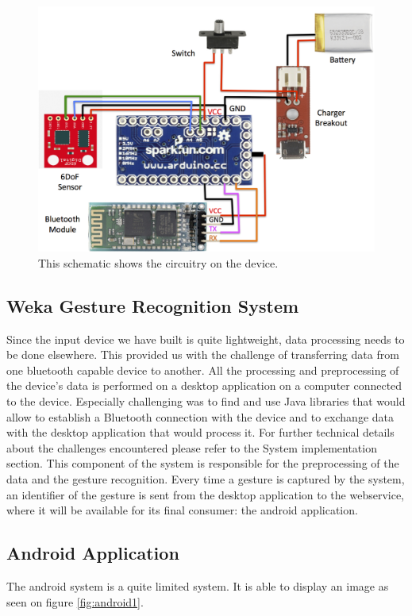 \begin{figure}[!h]
\centering
\includegraphics[width=1\columnwidth]{img/device_schematic}
\caption{This schematic shows the circuitry on the device.}
\label{fig:figure1}
\end{figure}

\subsection{Weka Gesture Recognition System}
Since the input device we have built is quite lightweight, data processing needs to be done elsewhere.
This provided us with the challenge of transferring data from one bluetooth capable device to another.
All the processing and preprocessing of the device's data is performed on a desktop application on a 
computer connected to the device.
Especially challenging was to find and use Java libraries that would allow to establish a Bluetooth 
connection with the device and to exchange data with the desktop application that would process it. 
For further technical details about the challenges encountered please refer to the System implementation section. 
This component of the system is responsible for the preprocessing of the data and the gesture recognition. 
Every time a gesture is captured by the system, an identifier of the gesture is sent from the desktop application to the webservice, 
where it will be available for its final consumer: the android application.

\subsection{Android Application}
The android system is a quite limited system.
It is able to display an image as seen on figure \ref{fig:android1}.

